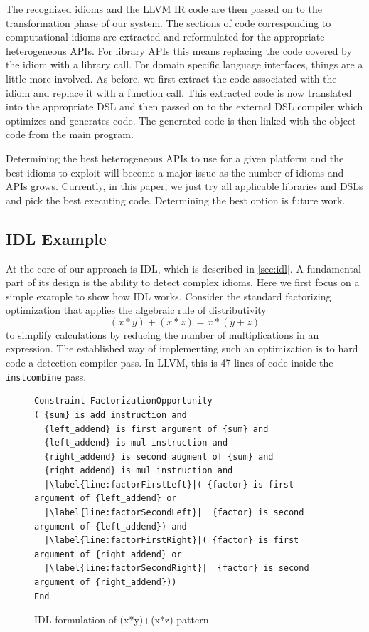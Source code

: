     The recognized idioms and the LLVM IR code are then passed on
    to the transformation phase of our system.
    The sections of code corresponding to computational idioms are extracted
    and reformulated for the appropriate heterogeneous APIs.
    For library  APIs this means replacing
    the code covered by the idiom with a library call. 
    For domain specific language interfaces,
    things are a little more involved. As before, we first extract the code
    associated with the idiom and replace it with a function call. This
    extracted code is now translated into the appropriate DSL and then
    passed on to the external DSL compiler which optimizes and generates
    code. The generated code is then linked
    with the object code from the main program.

    Determining the best heterogeneous APIs to use for a given platform
    and the best idioms to exploit will become a major issue as the number
    of idioms and APIs grows.  Currently, in this paper, we just try all
    applicable libraries and DSLs and pick the best executing
    code. Determining the best option is future work.

\subsection{IDL Example}

    At the core of our approach is IDL, which is described in \autoref{sec:idl}.
    A fundamental part of its design is the
    ability to detect  complex idioms.  Here we first focus on a simple example
    to show how IDL works.  Consider the standard factorizing
    optimization that applies the algebraic rule of distributivity
    \[(x*y)+(x*z) = x*(y+z)\]
    to simplify calculations by reducing the number of multiplications in an
    expression.
    The established way of implementing such an optimization is to hard code a
    detection compiler pass.
    In LLVM, this is 47 lines of code inside the \texttt{instcombine} pass.

\begin{figure}[t]
\begin{lstlisting}[language={constraints},escapechar=|,basicstyle=\linespread{1.133}\scriptsize\ttfamily]
Constraint FactorizationOpportunity
( {sum} is add instruction and
  {left_addend} is first argument of {sum} and
  {left_addend} is mul instruction and
  {right_addend} is second augment of {sum} and
  {right_addend} is mul instruction and
  |\label{line:factorFirstLeft}|( {factor} is first argument of {left_addend} or
  |\label{line:factorSecondLeft}|  {factor} is second argument of {left_addend}) and
  |\label{line:factorFirstRight}|( {factor} is first argument of {right_addend} or
  |\label{line:factorSecondRight}|  {factor} is second argument of {right_addend}))
End
\end{lstlisting}
\vspace{-0.3cm}
\caption{IDL formulation of (x*y)+(x*z) pattern}
\label{fig:IDLfactorization}
\end{figure}

